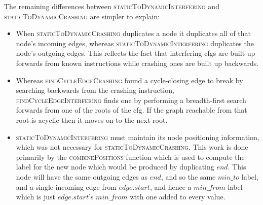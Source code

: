The remaining differences between \textsc{staticToDynamicInterfering}
and \textsc{staticToDynamicCrashing} are simpler to explain:
\begin{itemize}
\item When \textsc{staticToDynamicCrashing} duplicates a node it
  duplicates all of that node's incoming edges, whereas
  \textsc{staticToDynamicInterfering} duplicates the node's outgoing
  edges.  This reflects the fact that interfering \glspl{cfg} are
  built up forwards from known instructions while crashing ones are
  built up backwards.
\item Whereas \textsc{findCycleEdgeCrashing} found a cycle-closing
  edge to break by searching backwards from the crashing instruction,
  \textsc{findCycleEdgeInterfering} finds one by performing a
  breadth-first search forwards from one of the roots of the
  \gls{cfg}.  If the graph reachable from that root is acyclic then it
  moves on to the next root.
\item \textsc{staticToDynamicInterfering} must maintain its node
  positioning information, which was not necessary for
  \textsc{staticToDynamicCrashing}.  This work is done primarily by
  the \textsc{combinePositions} function which is used to compute the
  label for the new node which would be produced by duplicating
  $\mathit{end}$.  This node will have the same outgoing edges as
  $\mathit{end}$, and so the same $min\_to$ label, and a single
  incoming edge from $\mathit{edge}.\mathit{start}$, and hence a
  $\mathit{min\_from}$ label which is just
  $\mathit{edge}.\mathit{start}$'s $\mathit{min\_from}$ with one added
  to every value.
\end{itemize}

\newcommand{\shortrightarrow}{\begin{tikzpicture}[baseline= -1ex*.75]
    \draw[->] (0,0) -- ++(.25,0);
  \end{tikzpicture}
  \hspace{-1pt}
}

